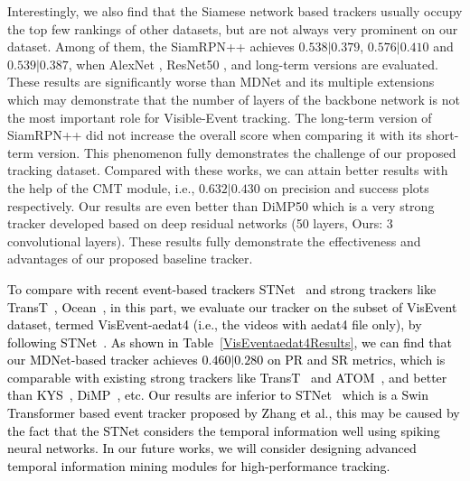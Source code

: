 \documentclass[journal]{IEEEtran}
\begin{document}
Interestingly, we also find that the Siamese network based trackers usually occupy the top few rankings of other datasets, but are not always very prominent on our dataset. Among of them, the SiamRPN++ \cite{li2018siamrpn++} achieves $0.538|0.379$, $0.576|0.410$ and $0.539|0.387$,  when AlexNet \cite{krizhevsky2012alexnet}, ResNet50 \cite{he2016deepResNet}, and long-term versions are evaluated. These results are significantly worse than MDNet and its multiple extensions which may demonstrate that the number of layers of the backbone network is not the most important role for Visible-Event tracking. The long-term version of SiamRPN++ did not increase the overall score when comparing it with its short-term version. This phenomenon fully demonstrates the challenge of our proposed tracking dataset. Compared with these works, we can attain better results with the help of the CMT module, i.e., $0.632|0.430$ on precision and success plots respectively. Our results are even better than DiMP50 \cite{bhat2019DiMP} which is a very strong tracker developed based on deep residual networks (50 layers, Ours: 3 convolutional layers). These results fully demonstrate the effectiveness and advantages of our proposed baseline tracker. 


\textcolor{black}{
To compare with recent event-based trackers STNet~\cite{zhang2022STNet} and strong trackers like TransT~\cite{chen2021TransT}, Ocean~\cite{zhang2020ocean}, in this part, we evaluate our tracker on the subset of VisEvent dataset, termed VisEvent-aedat4 (i.e., the videos with aedat4 file only), by following STNet~\cite{zhang2022STNet}. As shown in Table~\ref{VisEventaedat4Results}, we can find that our MDNet-based tracker achieves $0.460|0.280$ on PR and SR metrics, which is comparable with existing strong trackers like TransT~\cite{chen2021TransT} and ATOM~\cite{danelljan2019atom}, and better than KYS~\cite{Goutam2020KYS}, DiMP~\cite{bhat2019DiMP}, etc. Our results are inferior to STNet~\cite{zhang2022STNet} which is a Swin Transformer based event tracker proposed by Zhang et al., this may be caused by the fact that the STNet considers the temporal information well using spiking neural networks. In our future works, we will consider designing advanced temporal information mining modules for high-performance tracking. 
}
\end{document}

